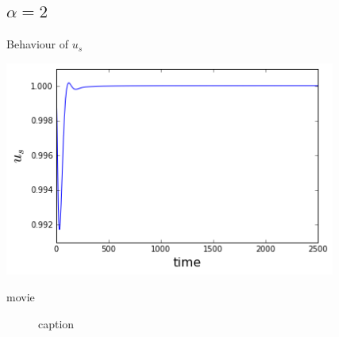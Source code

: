 \documentclass{beamer}
\begin{document}
\subsection{$\alpha = 2$}
\begin{frame}{Behaviour of $u_s$}
	\begin{center}
		\includegraphics[height=200pt]{2}\\
		
	\end{center}	
\end{frame}
\begin{frame}{movie}
	\begin{figure}[h!]
		\centering    
		\caption{caption}
	\end{figure} 
\end{frame}
\end{document}
